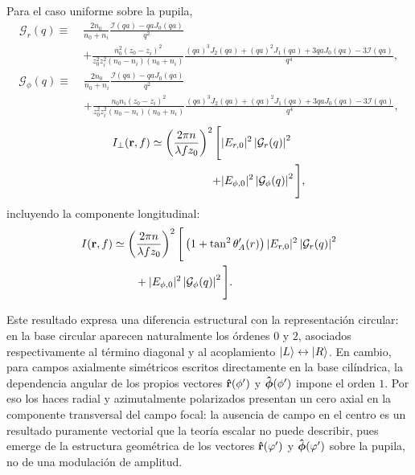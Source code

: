 Para el caso uniforme sobre la pupila,
\begin{equation}
\begin{aligned}
\mathcal G_r(q)
\equiv\;&
\frac{2n_0}{n_0+n_i}
\frac{\mathcal I(qa)-qaJ_0(qa)}{q^2}
\\[0.3em]
&+
\frac{
n_0^2(z_0-z_i)^2
}{
z_0^2z_i^2(n_0-n_i)(n_0+n_i)
}
\frac{
(qa)^3J_2(qa)
+
(qa)^2J_1(qa)
+
3qaJ_0(qa)
-
3\mathcal I(qa)
}{q^4},
\end{aligned}
\label{eq:Gr_cylindrical}
\end{equation}
\begin{equation}
\begin{aligned}
\mathcal G_\phi(q)
\equiv\;&
\frac{2n_0}{n_0+n_i}
\frac{\mathcal I(qa)-qaJ_0(qa)}{q^2}
\\[0.3em]
&+
\frac{
n_0n_i(z_0-z_i)^2
}{
z_0^2z_i^2(n_0-n_i)(n_0+n_i)
}
\frac{
(qa)^3J_2(qa)
+
(qa)^2J_1(qa)
+
3qaJ_0(qa)
-
3\mathcal I(qa)
}{q^4},
\end{aligned}
\label{eq:Gphi_cylindrical}
\end{equation}
\begin{equation}
\begin{aligned}
  I_\perp(\vb r,f)
  \simeq
  \left(
  \frac{2\pi n}{\lambda f z_0}
  \right)^2
  \Bigg[
  &
  |E_{r,0}|^2
  \left|
  \mathcal G_r(q)
  \right|^2
  \\
  +
  &
  |E_{\phi,0}|^2
  \left|
  \mathcal G_\phi(q)
  \right|^2
  \Bigg],
\end{aligned}
\label{eq:I_perp_cylindrical_homogeneous}
\end{equation}
incluyendo la componente longitudinal:
\begin{equation}
\begin{aligned}
I(\vb r,f)
&\simeq
\left(
\frac{2\pi n}{\lambda f z_0}
\right)^2
\Bigg[
\left(1+\tan^2\theta_A'(r)\right)
|E_{r,0}|^2
\left|
\mathcal G_r(q)
\right|^2
\\
&\qquad
+
|E_{\phi,0}|^2
\left|
\mathcal G_\phi(q)
\right|^2
\Bigg].
\end{aligned}
\label{eq:I_total_cylindrical_homogeneous}
\end{equation}

Este resultado expresa una diferencia estructural con la representación circular: en la base circular aparecen naturalmente los órdenes \(0\) y \(2\), asociados respectivamente al término diagonal y al acoplamiento \(\ket L\leftrightarrow\ket R\). En cambio, para campos axialmente simétricos escritos directamente en la base cilíndrica, la dependencia angular de los propios vectores \(\bm{\hat{\mathbf{r}}}(\phi')\) y \(\bm{\hat{\mathbf{\phi}}}(\phi')\) impone el orden \(1\). Por eso los haces radial y azimutalmente polarizados presentan un cero axial en la componente transversal del campo focal: la ausencia de campo en el centro es un resultado puramente vectorial que la teoría escalar no puede describir, pues emerge de la estructura geométrica de los vectores $\bm{\hat{\mathbf{r}}}(\varphi')$ y $\bm{\hat{\mathbf{\phi}}}(\varphi')$ sobre la pupila, no de una modulación de amplitud.

